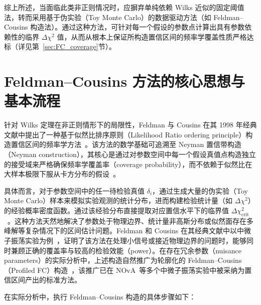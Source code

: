 综上所述，当面临此类非正则情况时，应摒弃单纯依赖 Wilks 近似的固定阈值法，转而采用基于伪实验（Toy Monte Carlo）的数据驱动方法（如 Feldman--Cousins 构造法）。通过这种方法，可针对每一个假设的参数点计算出具有参数依赖性的临界 $\Delta\chi^2$ 值，从而从根本上保证所构造置信区间的频率学覆盖性质严格达标（详见第~\ref{sec:FC_coverage}节）\cite{Feldman_1998, Cranmer:2005hi}。


\section{Feldman--Cousins 方法的核心思想与基本流程}
\label{sec:FC}

针对 Wilks 定理在非正则情形下的局限性，Feldman 与 Cousins 在其 1998 年经典文献中提出了一种基于似然比排序原则（Likelihood Ratio ordering principle）构造置信区间的频率学方法~\cite{Feldman_1998}。该方法的数学基础可追溯至 Neyman 置信带构造（Neyman construction）\cite{Cowan:2010js, ParticleDataGroup:2024cfk}，其核心是通过对参数空间中每一个假设真值点构造独立的接受域来严格确保频率学覆盖率（coverage probability），而不依赖于似然比在大样本极限下服从卡方分布的假设~\cite{Cranmer:2005hi, Fan:2000gm}。

具体而言，对于参数空间中的任一待检验真值 $\delta_i$，通过生成大量的伪实验（Toy Monte Carlo）样本来模拟实验观测的统计分布，进而构建检验统计量（如 $\Delta\chi^2$）的经验概率密度函数。通过该经验分布直接提取对应置信水平下的临界值 $\Delta\chi^2_{\mathrm{crit}}$~\cite{Feldman_1998, Cowan:2010js}。这种方法天然地解决了参数处于物理边界、统计量非高斯分布或似然面存在多峰解等复杂情况下的区间估计问题。Feldman 和 Cousins 在其经典文献中以中微子振荡实验为例~\cite{Feldman_1998}，证明了该方法在处理小信号或接近物理边界的问题时，能够同时兼顾正确的覆盖率与较高的检验效能（power）。在存在冗余参数（nuisance parameters）的实际分析中，上述构造自然推广为轮廓化的 Feldman--Cousins（Profiled FC）构造~\cite{Acero2022ProfiledFC}，该推广已在 NOvA~\cite{refId0}等多个中微子振荡实验中被采纳为置信区间产出的标准方法。

\label{sec:FC_flow}
在实际分析中，执行 Feldman--Cousins 构造的具体步骤如下：


